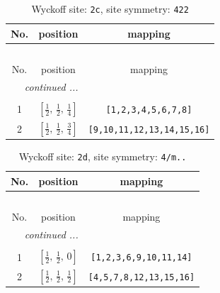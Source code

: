 \documentclass[fleqn,8pt]{jsarticle}
\begin{document}
\renewcommand{\arraystretch}{1.2}
\begin{longtable}{ccc}
\caption{Wyckoff site: {\tt 2c}, site symmetry: {\tt 422}}
 \\
 \hline \hline
No. & position & mapping \\ \hline \endfirsthead

\multicolumn{2}{l}{\tablename\ \thetable{}} \\
 \hline \hline
No. & position & mapping \\ \hline \endhead

 \hline \hline
\multicolumn{2}{r}{\footnotesize\it continued ...} \\ \endfoot

 \hline \hline
\multicolumn{2}{r}{} \\ \endlastfoot

1 & $\left[ \frac{1}{2},\, \frac{1}{2},\, \frac{1}{4} \right]$ & {\tt [1,2,3,4,5,6,7,8]} \\ \hline
2 & $\left[ \frac{1}{2},\, \frac{1}{2},\, \frac{3}{4} \right]$ & {\tt [9,10,11,12,13,14,15,16]} \\
\end{longtable}
\renewcommand{\arraystretch}{1.2}
\begin{longtable}{ccc}
\caption{Wyckoff site: {\tt 2d}, site symmetry: {\tt 4/m..}}
 \\
 \hline \hline
No. & position & mapping \\ \hline \endfirsthead

\multicolumn{2}{l}{\tablename\ \thetable{}} \\
 \hline \hline
No. & position & mapping \\ \hline \endhead

 \hline \hline
\multicolumn{2}{r}{\footnotesize\it continued ...} \\ \endfoot

 \hline \hline
\multicolumn{2}{r}{} \\ \endlastfoot

1 & $\left[ \frac{1}{2},\, \frac{1}{2},\, 0 \right]$ & {\tt [1,2,3,6,9,10,11,14]} \\ \hline
2 & $\left[ \frac{1}{2},\, \frac{1}{2},\, \frac{1}{2} \right]$ & {\tt [4,5,7,8,12,13,15,16]} \\
\end{longtable}
\renewcommand{\arraystretch}{1.2}
\end{document}
